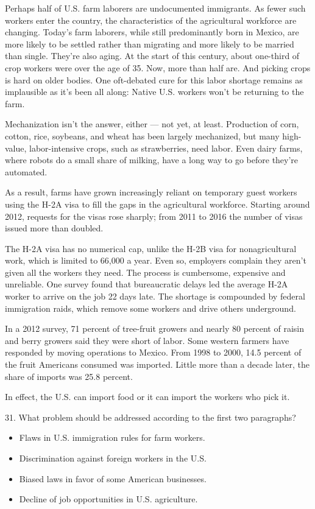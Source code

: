 \documentclass[UTF8,11pt]{ctexart}
\begin{document}
Perhaps half of U.S. farm laborers are undocumented immigrants. As fewer such workers enter the country, the characteristics of the agricultural workforce are changing. Today's farm laborers, while still predominantly born in Mexico, are more likely to be settled rather than migrating and more likely to be married than single. They're also aging. At the start of this century, about one-third of crop workers were over the age of 35. Now, more than half are. And picking crops is hard on older bodies. One oft-debated cure for this labor shortage remains as implausible as it's been all along: Native U.S. workers won't be returning to the farm.


Mechanization isn't the answer, either — not yet, at least. Production of corn, cotton, rice, soybeans, and wheat has been largely mechanized, but many high-value, labor-intensive crops, such as strawberries, need labor. Even dairy farms, where robots do a small share of milking, have a long way to go before they're automated.


As a result, farms have grown increasingly reliant on temporary guest workers using the H-2A visa to fill the gaps in the agricultural workforce. Starting around 2012, requests for the visas rose sharply; from 2011 to 2016 the number of visas issued more than doubled.


The H-2A visa has no numerical cap, unlike the H-2B visa for nonagricultural work, which is limited to 66,000 a year. Even so, employers complain they aren't given all the workers they need. The process is cumbersome, expensive and unreliable. One survey found that bureaucratic delays led the average H-2A worker to arrive on the job 22 days late. The shortage is compounded by federal immigration raids, which remove some workers and drive others underground.


In a 2012 survey, 71 percent of tree-fruit growers and nearly 80 percent of raisin and berry growers said they were short of labor. Some western farmers have responded by moving operations to Mexico. From 1998 to 2000, 14.5 percent of the fruit Americans consumed was imported. Little more than a decade later, the share of imports was 25.8 percent.


In effect, the U.S. can import food or it can import the workers who pick it.


31. What problem should be addressed according to the first two paragraphs?


\begin{itemize}[leftmargin=2em,itemsep=.2em,topsep=.4em]\item[A.] Flaws in U.S. immigration rules for farm workers.
\item[B.] Discrimination against foreign workers in the U.S.
\item[C.] Biased laws in favor of some American businesses.
\item[D.] Decline of job opportunities in U.S. agriculture.
\end{itemize}
\end{document}
